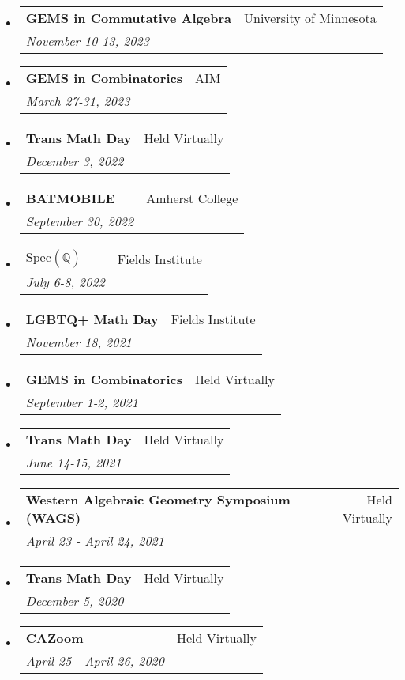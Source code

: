 \documentclass[letterpaper,11pt]{article}
\makeatletter
\newcommand{\ressubheading}[4]{
\begin{tabular*}{6.5in}[t]{l@{\cftdotfill{\cftsecdotsep}\extracolsep{\fill}}r}
		\textbf{#1} & #2 \\
		\textit{#3} & \textit{#4} \\
\end{tabular*}\vspace{-6pt}}
\makeatother
\begin{document}
\begin{itemize}

\item 
\ressubheading{GEMS in Commutative Algebra}{University of Minnesota}{November 10-13, 2023}{} 

\item 
\ressubheading{GEMS in Combinatorics}{AIM}{March 27-31, 2023}{} 

\item 
\ressubheading{Trans Math Day }{Held Virtually}{December 3, 2022}{} 


\item
\ressubheading{BATMOBILE}{Amherst College}{September 30, 2022}{} 

\item 
\ressubheading{$\text{Spec}(\overline{\mathbb{Q}})$}{Fields Institute}{July 6-8, 2022}{} 

\item 
\ressubheading{LGBTQ+ Math Day}{Fields Institute}{November 18, 2021}{} 

\item 
\ressubheading{GEMS in Combinatorics}{Held Virtually}{September 1-2, 2021}{} 

\item 
\ressubheading{Trans Math Day }{Held Virtually}{June 14-15, 2021}{} 


\item
\ressubheading{Western Algebraic Geometry Symposium (WAGS)}{Held Virtually}{April 23 - April 24, 2021}{} 

\item 
\ressubheading{Trans Math Day }{Held Virtually}{December 5, 2020}{} 


\item 
\ressubheading{CAZoom}{Held Virtually}{April 25 - April 26, 2020}{} 

%


\end{itemize}
\end{document}
